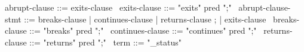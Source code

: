 \begin{syntax}
  abrupt-clause ::= exits-clause
  \
  exits-clause ::= "exits" pred ";"
  \
  abrupt-clause-stmt ::= breaks-clause | continues-clause | returns-clause ;
                        | exits-clause 
  \
  breaks-clause ::= "breaks" pred ";"
  \
  continues-clause ::= "continues" pred ";"
  \
  returns-clause ::= "returns" pred ";"
  \
  term  ::= "\exit_status"
\end{syntax}
